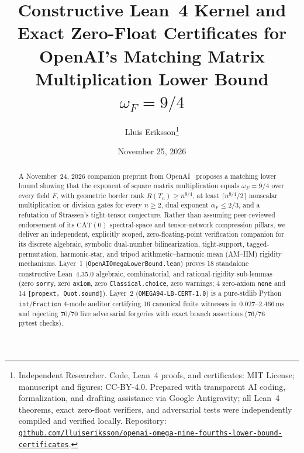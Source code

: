 \documentclass[10pt,twocolumn]{article}
\title{\vspace{-0.9em}\textbf{Constructive Lean~4 Kernel and Exact Zero-Float Certificates for OpenAI's Matching Matrix Multiplication Lower Bound $\omega_F = 9/4$}}
\author{Lluis Eriksson\thanks{Independent Researcher. Code, Lean~4 proofs, and certificates: MIT License; manuscript and figures: CC-BY-4.0. Prepared with transparent AI coding, formalization, and drafting assistance via Google Antigravity; all Lean~4 theorems, exact zero-float verifiers, and adversarial tests were independently compiled and verified locally. Repository: \href{https://github.com/lluiseriksson/openai-omega-nine-fourths-lower-bound-certificates}{\nolinkurl{github.com/lluiseriksson/openai-omega-nine-fourths-lower-bound-certificates}}.}}
\date{November 25, 2026}
\begin{document}
\maketitle
\vspace{-1.2em}

\begin{abstract}
A November~24, 2026 companion preprint from OpenAI~\cite{openai2026omega94} proposes a matching lower bound showing that the exponent of square matrix multiplication equals $\omega_F = 9/4$ over every field $F$, with geometric border rank $\underline{R}(T_n)\ge n^{9/4}$, at least $\lceil n^{9/4}/2\rceil$ nonscalar multiplication or division gates for every $n\ge 2$, dual exponent $\alpha_F\le 2/3$, and a refutation of Strassen's tight-tensor conjecture. Rather than assuming peer-reviewed endorsement of its $\mathrm{CAT}(0)$ spectral-space and tensor-network compression pillars, we deliver an independent, explicitly scoped, zero-floating-point verification companion for its discrete algebraic, symbolic dual-number bilinearization, tight-support, tagged-permutation, harmonic-star, and tripod arithmetic--harmonic mean (AM--HM) rigidity mechanisms. Layer~1 (\nolinkurl{OpenAIOmegaLowerBound.lean}) proves 18 standalone constructive Lean~4.35.0 algebraic, combinatorial, and rational-rigidity sub-lemmas (zero \texttt{sorry}, zero \texttt{axiom}, zero \texttt{Classical.choice}, zero warnings; 4 zero-axiom \texttt{none} and 14 \texttt{[propext, Quot.sound]}). Layer~2 (\texttt{OMEGA94-\allowbreak LB-\allowbreak CERT-1.0}) is a pure-stdlib Python \texttt{int}/\texttt{Fraction} 4-mode auditor certifying 16 canonical finite witnesses in $0.027$--$2.466\,\mathrm{ms}$ and rejecting 70/70 live adversarial forgeries with exact branch assertions (76/76 pytest checks).
\end{abstract}
\end{document}
